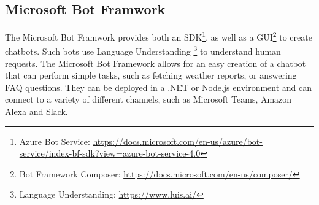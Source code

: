 \subsection{Microsoft Bot Framwork}
The Microsoft Bot Framwork provides both an SDK\footnote{Azure Bot Service: \href{https://docs.microsoft.com/en-us/azure/bot-service/index-bf-sdk?view=azure-bot-service-4.0}{https://docs.microsoft.com/en-us/azure/bot-service/index-bf-sdk?view=azure-bot-service-4.0}}, as well as a GUI\footnote{Bot Framework Composer: \href{https://docs.microsoft.com/en-us/composer/}{https://docs.microsoft.com/en-us/composer/}} to create chatbots. Such bots use Language Understanding \footnote{Language Understanding: \href{https://www.luis.ai/}{https://www.luis.ai/}} to understand human requests. The Microsoft Bot Framework allows for an easy creation of a chatbot that can perform simple tasks, such as fetching weather reports, or answering FAQ questions. They can be deployed in a .NET or Node.js environment and can connect to a variety of different channels, such as Microsoft Teams, Amazon Alexa and Slack.